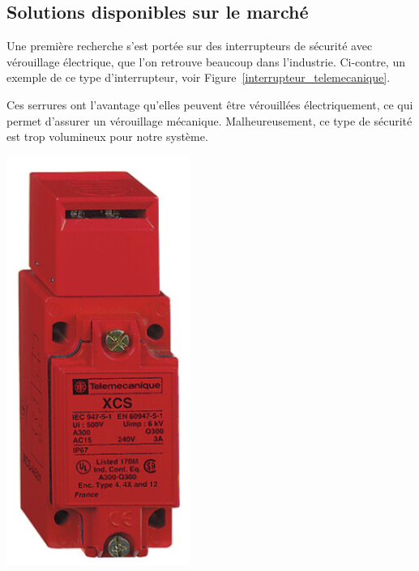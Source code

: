 \subsection{Solutions disponibles sur le marché}
\begin{minipage}[c]{0.6\textwidth}
    Une première recherche s'est portée sur des interrupteurs de sécurité avec vérouillage électrique, que l'on retrouve beaucoup dans l'industrie. Ci-contre, un exemple de ce type d'interrupteur, voir Figure~\ref{interrupteur_telemecanique}.

    Ces serrures ont l'avantage qu'elles peuvent être vérouillées électriquement, ce qui permet d'assurer un vérouillage mécanique. Malheureusement, ce type de sécurité est trop volumineux pour notre système.
\end{minipage}\hfill
\begin{minipage}[c]{0.35\textwidth}
    \begin{center}
        \includegraphics[width=0.45\textwidth]{assets/figures/Protections_laser/Securite_electrique/serrure_telemecanique.png}
    \end{center}
    \label{interrupteur_telemecanique}
\end{minipage}

